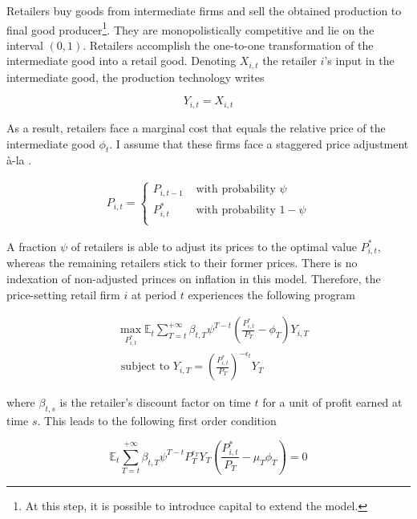 Retailers buy goods from intermediate firms and sell the obtained production to final good producer\footnote{At this step, it is possible to introduce capital to extend the model.}. They are monopolistically competitive and lie on the interval $(0,1)$. Retailers accomplish the one-to-one transformation of the intermediate good into a retail good. Denoting $X_{i,t}$ the retailer $i$'s input in the intermediate good, the production technology writes

\begin{equation*}
Y_{i,t} = X_{i,t}
\end{equation*}

As a result, retailers face a marginal cost that equals the relative price of the intermediate good $\phi_t$. I assume that these firms face a staggered price adjustment à-la \citet{calvo1983staggered}.

\begin{align*}
P_{i,t} = \left\{ \begin{array}{ll}
P_{i,t-1} & \text{ with probability } \psi\\
P_{i,t}^* & \text{ with probability } 1-\psi\\
\end{array}
\right.
\end{align*}

A fraction $\psi$ of retailers is able to adjust its prices to the optimal value $P_{i,t}^*$, whereas the  remaining retailers stick to their former prices. There is no indexation of non-adjusted princes on inflation in this model. Therefore, the price-setting retail firm $i$ at period $t$ experiences the following program

\begin{align*}
&\max_{P_{i,t}^*} \mathbb{E}_{t} \sum_{T = t}^{+\infty} \beta_{t,T} \psi^{T-t} \left( \frac{P_{i,t}^*}{P_T} - \phi_{T} \right) Y_{i,T} \\
&\text{ subject to } Y_{i,T} = \left( \frac{P_{i,t}^*}{P_T} \right)^{-\epsilon_t} Y_T
\end{align*}

where $\beta_{t,s}$ is the retailer's discount factor on time $t$ for a unit of profit earned at time $s$. This leads to the following first order condition

\begin{equation}
\mathbb{E}_{t} \sum_{T = t}^{+\infty} \beta_{t,T} \psi^{T-t} P_T^{\epsilon_T} Y_T \left( \frac{P_{i,t}^*}{P_T} - \mu_T \phi_T \right) = 0 \label{eq:price_eq}
\end{equation}

